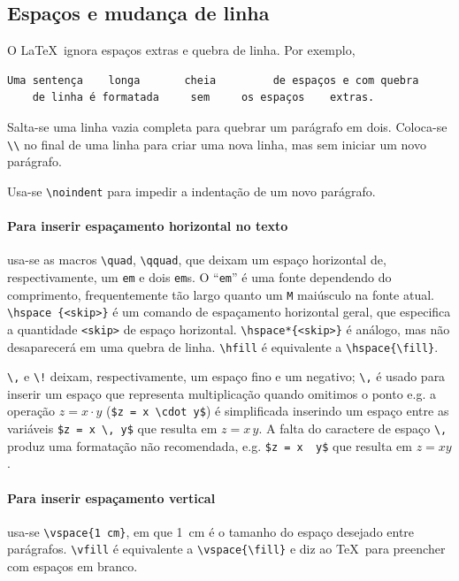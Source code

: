 \subsection{Espaços e mudança de linha}

O \LaTeX\ ignora espaços extras e quebra de linha. Por exemplo, 
\begin{lstlisting}[language={[Latex]Tex},frame=single]
	Uma sentença    longa       cheia         de espaços e com quebra 
	de linha é formatada     sem     os espaços    extras.
\end{lstlisting}


Salta-se uma linha vazia completa para quebrar um parágrafo em  dois. Coloca-se \verb|\\| no final de uma linha para criar uma nova linha, mas sem iniciar um novo parágrafo.

Usa-se  \verb|\noindent| para impedir a indentação de um novo parágrafo.

\paragraph{Para inserir espaçamento horizontal no texto} usa-se as macros  \verb|\quad|, \verb|\qquad|,  que deixam um espaço horizontal de, respectivamente,  um \texttt{em} e dois \texttt{em}s. O ``\texttt{em}''  é uma fonte dependendo do comprimento, frequentemente tão largo quanto um \texttt{M} maiúsculo na fonte atual.
\verb|\hspace {<skip>}| é um comando de espaçamento horizontal geral, que especifica a  quantidade \texttt{<skip>} de espaço horizontal. \verb|\hspace*{<skip>}| é análogo, mas não desaparecerá em uma quebra de linha. \verb|\hfill| é equivalente a \verb|\hspace{\fill}|.

\verb|\,| e \verb|\!| deixam, respectivamente, um espaço fino e um negativo; \verb|\,| é usado para inserir um espaço que representa multiplicação quando omitimos o ponto e.g. a operação $z = x \cdot y$ (\verb|$z = x \cdot y$|) é simplificada inserindo um espaço entre as variáveis \verb|$z = x \, y$| que resulta em $z = x \, y$. A falta do caractere de espaço  \verb|\,| produz uma formatação não recomendada, e.g. \verb|$z = x  y$| que resulta em $z = x y$.

\paragraph{Para inserir espaçamento  vertical } usa-se \verb|\vspace{1 cm}|, em que \SI{1}{\centi\meter} é o tamanho do espaço desejado entre parágrafos. \verb|\vfill| é equivalente a \verb|\vspace{\fill}| e diz ao \TeX\ para preencher com espaços em branco.

